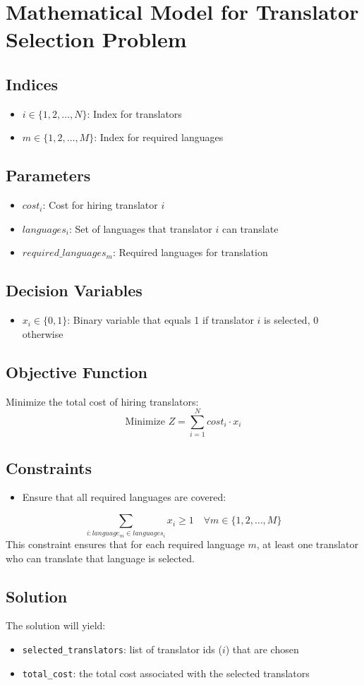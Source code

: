 \documentclass{article}
\begin{document}
\section*{Mathematical Model for Translator Selection Problem}

\subsection*{Indices}
\begin{itemize}
    \item $i \in \{1, 2, \ldots, N\}$: Index for translators
    \item $m \in \{1, 2, \ldots, M\}$: Index for required languages
\end{itemize}

\subsection*{Parameters}
\begin{itemize}
    \item $cost_i$: Cost for hiring translator $i$
    \item $languages_i$: Set of languages that translator $i$ can translate
    \item $required\_languages_m$: Required languages for translation
\end{itemize}

\subsection*{Decision Variables}
\begin{itemize}
    \item $x_i \in \{0, 1\}$: Binary variable that equals 1 if translator $i$ is selected, 0 otherwise
\end{itemize}

\subsection*{Objective Function}
Minimize the total cost of hiring translators:
\[
\text{Minimize } Z = \sum_{i=1}^{N} cost_i \cdot x_i
\]

\subsection*{Constraints}
\begin{itemize}
    \item Ensure that all required languages are covered:
\end{itemize}
\[
\sum_{i: language_m \in languages_i} x_i \geq 1 \quad \forall m \in \{1, 2, \ldots, M\}
\]
This constraint ensures that for each required language $m$, at least one translator who can translate that language is selected.

\subsection*{Solution}
The solution will yield:
\begin{itemize}
    \item \texttt{selected\_translators}: list of translator ids ($i$) that are chosen
    \item \texttt{total\_cost}: the total cost associated with the selected translators
\end{itemize}
\end{document}
